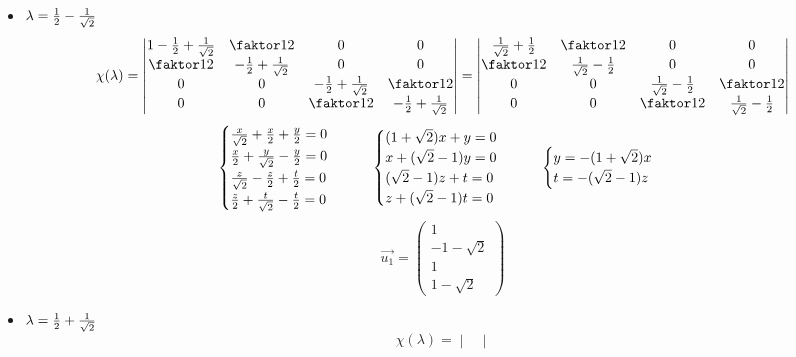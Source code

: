 \begin{itemize}
    \item $ \lambda = \half - \frac1{\sqrt2} $
    $$ \chi(\lambda) =
    \begin{vmatrix}
        1 - \half + \frac1{\sqrt2} & \faktor12 & 0 & 0 \\
        \faktor12 & -\half + \frac1{\sqrt2} & 0 & 0 \\
        0 & 0 & -\half + \frac1{\sqrt2} & \faktor12 \\
        0 & 0 & \faktor12 & -\half + \frac1{\sqrt2}
    \end{vmatrix} =
    \begin{vmatrix}
    	\frac1{\sqrt2} + \half & \faktor12 & 0 & 0 \\
        \faktor12 & \frac1{\sqrt2} - \half & 0 & 0 \\
        0 & 0 & \frac1{\sqrt2} - \half & \faktor12 \\
        0 & 0 & \faktor12 & \frac1{\sqrt2} - \half
    \end{vmatrix} $$
    $$
    \begin{cases}
        \frac{x}{\sqrt2} + \half[x] + \half[y] = 0 \\
        \half[x] + \frac{y}{\sqrt2} - \half[y] = 0 \\
        \frac{z}{\sqrt2} - \half[z] + \half[t] = 0 \\
        \half[z] + \frac{t}{\sqrt2} - \half[t] = 0
    \end{cases} \qquad
    \begin{cases}
        (1 + \sqrt2)x + y = 0 \\
        x + (\sqrt2 - 1)y = 0 \\
        (\sqrt2 - 1)z + t = 0 \\
        z + (\sqrt2 - 1)t = 0
    \end{cases} \qquad
    \begin{cases}
    	y = -(1 + \sqrt2)x \\
        t = -(\sqrt2 - 1)z
    \end{cases} $$
    $$ \vec{u_1} =
    \begin{pmatrix}
    	1 \\
        -1 - \sqrt2 \\
        1 \\
        1 - \sqrt2
    \end{pmatrix} $$
    \item $ \lambda = \half + \frac1{\sqrt2} $
    $$ \chi(\lambda) =
    \begin{vmatrix}

\end{vmatrix}$$
\end{itemize}
